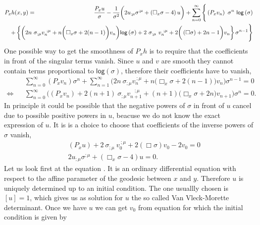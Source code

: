 \documentclass[10pt]{book}
\theoremstyle{break}
\begin{document}
\begin{eqnarray*}
%
P_x h(x,y) &=& \frac{P_x u}{\sigma} 
- \frac{1}{\sigma^2} \bigg( 2 u_{;\mu} \sigma^{;\mu} + \left(\Box_x \sigma - 4 \right) u  \bigg)
+ \sum_{n=0}^\infty \Bigg\{ \left(P_x v_n\right) \ \sigma^n \ \mathsf{log}\left(\sigma\right) \\ 
&& \hspace*{-50pt} + \left\{ \bigg( 2 n \ \sigma_{;\mu} v_n^{\ ;\mu} + n \bigg( \Box_x \sigma + 2(n-1) \bigg) v_n \bigg) \mathsf{log}\left(\sigma\right) 
+ 2 \ \sigma_{;\mu} \ v_n^{\ ; \mu } + 2 \bigg( \left(\Box\sigma\right) + 2n-1 \bigg) v_n \right\}\sigma^{n-1} \Bigg\}
\end{eqnarray*}
%
One possible way to get the smoothness of $P_xh$ is to require that the coefficients in front of the singular terms vanish. Since $u$ and $v$ are smooth they cannot contain terms proportional to $\mathsf{log}\left(\sigma\right)$, therefore their coefficients have to vanish,%
%
\begin{eqnarray*}
&& \sum_{n=0}^\infty \left(P_x v_n\right) \sigma^n + 
\sum_{n=1}^\infty \bigg( 2 n \ \sigma_{;\mu} v_n^{\ ;\mu} + n \bigg( \Box_x \sigma + 2(n-1) \bigg) v_n \bigg) \sigma^{n-1} = 0 \\
\Longleftrightarrow && 
\sum_{n=0}^\infty \bigg( \left(P_x v_n\right) + 2 (n+1) \ \sigma_{;\mu} v_{n+1}^{\ \ \ \ ;\mu} + (n+1) \bigg( \Box_x \sigma + 2n \bigg) v_{n+1} \bigg) \sigma^{n} = 0
. %
\end{eqnarray*}
%
In principle it could be possible that the negative powers of $\sigma$ in front of $u$ cancel due to possible positive powers in $u$, beacuse we do not know the exact expression of $u$. It is is a choice to choose that coefficients of the inverse powers of $\sigma$ vanish,%
%
\begin{eqnarray*}
&& \left(P_x u\right) + 2 \ \sigma_{;\mu} \ v_0^{\ ; \mu } + 2 \left(\Box\sigma\right) v_0 - 2 v_0 = 0 %
\\
&& 2 u_{;\mu} \sigma^{;\mu} + \left(\Box_x \sigma - 4 \right) u = 0 . %
\end{eqnarray*}
%
Let us look first at the equation %
. It is an ordinary differential equation with respect to the affine parameter of the geodesic between $x$ and $y$. Therefore $u$ is uniquely determined up to an initial condition. The one usuallly chosen is $\left[u\right]=1$, which gives us as solution for $u$ the so called Van Vleck-Morette determinant. Once we have $u$ we can get $v_0$ from equation %
for which the initial condition is given by%
\end{document}
